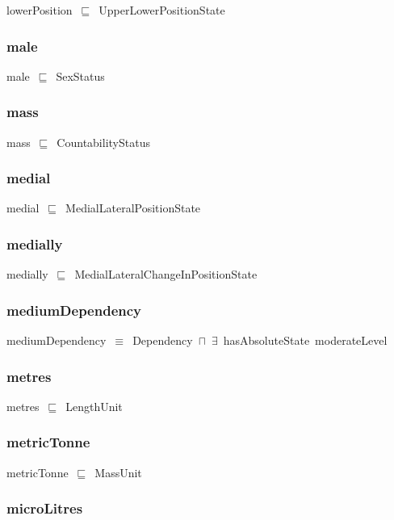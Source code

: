 \documentclass{article}
\begin{document}
lowerPosition~\ensuremath{\sqsubseteq}~UpperLowerPositionState~

\subsubsection*{male}

male~\ensuremath{\sqsubseteq}~SexStatus~

\subsubsection*{mass}

mass~\ensuremath{\sqsubseteq}~CountabilityStatus~

\subsubsection*{medial}

medial~\ensuremath{\sqsubseteq}~MedialLateralPositionState~

\subsubsection*{medially}

medially~\ensuremath{\sqsubseteq}~MedialLateralChangeInPositionState~

\subsubsection*{mediumDependency}

mediumDependency~\ensuremath{\equiv}~Dependency~\ensuremath{\sqcap}~\ensuremath{\exists}~hasAbsoluteState~moderateLevel

\subsubsection*{metres}

metres~\ensuremath{\sqsubseteq}~LengthUnit~

\subsubsection*{metricTonne}

metricTonne~\ensuremath{\sqsubseteq}~MassUnit~

\subsubsection*{microLitres}
\end{document}
